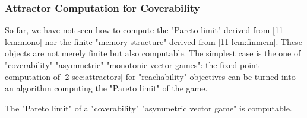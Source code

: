 \subsubsection{Attractor Computation for Coverability}
\label{11-sec:attr}
So far, we have not seen how to compute the "Pareto limit" derived
from \cref{11-lem:mono} nor the finite "memory structure" derived
from \cref{11-lem:finmem}.  These objects are not merely finite but
also computable.  The simplest case is the one of "coverability"
"asymmetric" "monotonic vector games": the fixed-point computation of
\cref{2-sec:attractors} for "reachability" objectives can be turned into
an algorithm computing the "Pareto limit" of the game.

\begin{fact}
\label{11-fact:pareto-cov}
  The "Pareto limit" of a "coverability" "asymmetric vector game" is
  computable.
\end{fact}

